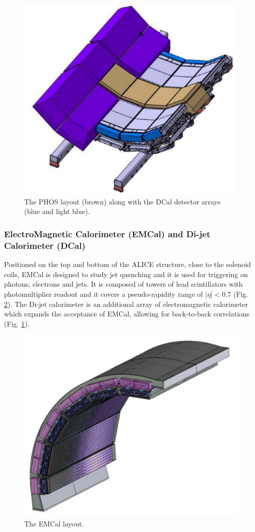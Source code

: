 \begin{figure}[!h]
\begin{center}
\includegraphics[width=0.5\linewidth]{Chapters/Introduction/Figs/phos.pdf}
\caption{The PHOS layout (brown) along with the DCal detector arrays (blue and light blue).}
\label{fig:PHOS}
\end{center}
\end{figure}

\subsubsection{ElectroMagnetic Calorimeter (EMCal) and Di-jet Calorimeter (DCal)}
Positioned on the top and bottom of the ALICE structure, close to the solenoid coils, EMCal is designed to study jet quenching and it is used for triggering on photons, electrons and jets.
It is composed of towers of lead scintillators with photomultiplier readout and it covers a pseudo-rapidity range of $|\eta| < 0.7$ (Fig. \ref{fig:EMCAL}).
The Di-jet calorimeter is an additional array of electromagnetic calorimeter which expands the acceptance of EMCal, allowing for back-to-back correlations (Fig. \ref{fig:PHOS}).

\begin{figure}[!h]
\begin{center}
\includegraphics[width=0.5\linewidth]{Chapters/Introduction/Figs/emcal.pdf}
\caption{The EMCal layout.}
\label{fig:EMCAL}
\end{center}
\end{figure}

